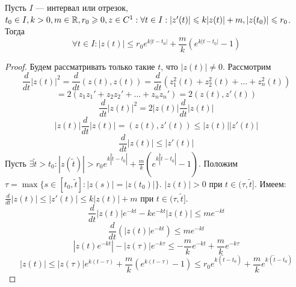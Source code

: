 \begin{lemma}
    Пусть \(I\) --- интервал или отрезок, \(t_0 \in I, k > 0, m \in \mathbb{R}, r_0 \geqslant 0, z \in C^1: \forall t \in I: |z'(t)| \leqslant k|z(t)| + m, |z(t_0)| \leqslant r_0\). Тогда 
    \[\forall t \in I: |z(t)| \le r_0e^{k|t - t_0|} + \frac{m}{k}\left( e^{k|t - t_0|} - 1\right)\]
\end{lemma}
\begin{proof}
    Будем рассматривать только такие \(t\), что \(|z(t)| \ne 0\). Рассмотрим 
    \[\frac{d}{dt}|z(t)|^2 = \frac{d}{dt}(z(t), z(t)) = \frac{d}{dt}\left( z_1^2(t) + z_2^2(t) + \dots + z_n^2(t) \right)\]
    \[= 2\left( z_1z_1' + z_2z_2' + \dots + z_nz_n' \right) = 2(z(t), z'(t))\]
    \[\frac{d}{dt}|z(t)|^2 = 2|z(t)|\frac{d}{dt}|z(t)|\]
    \[|z(t)|\frac{d}{dt}|z(t)| = (z(t), z'(t)) \le |z(t)||z'(t)|\]
    \[\frac{d}{dt}|z(t)| \le |z'(t)|\]
    Пусть \(\exists \tilde{t} > t_0: |z(\tilde{t})| > r_0e^{k|\tilde{t} - t_0|} + \frac{m}{k}\left( e^{k|\tilde{t} - t_0|} - 1 \right)\). Положим \(\tau = \max\{s \in [t_0, \tilde{t}]: |z(s)| = |z(t_0)|\}\). \(|z(t)| > 0\) при \(t \in (\tau, \tilde{t}]\). Имеем: \(\frac{d}{dt}|z(t)| \le |z'(t)| \le k|z(t)| + m\) при \(t \in (\tau, \tilde{t}]\).
    \[\frac{d}{dt}|z(t)|e^{-kt} - ke^{-kt}|z(t)| \le me^{-kt}\]
    \[\frac{d}{dt}\left( |z(t)|e^{-kt} \right) \le me^{-kt}\]
    \[|z(t)e^{-kt}| - |z(\tau)|e^{-k\tau} \le -\frac{m}{k}e^{-kt} + \frac{m}{k}e^{-k\tau}\]
    \[|z(t)| \le |z(\tau)|e^{k(t - \tau)} + \frac{m}{k}\left( e^{k(t - \tau)} - 1 \right) \le r_0e^{k(\tilde{t} - t_0)} + \frac{m}{k}e^{k(\tilde{t} - t_0)}\]
\end{proof}
